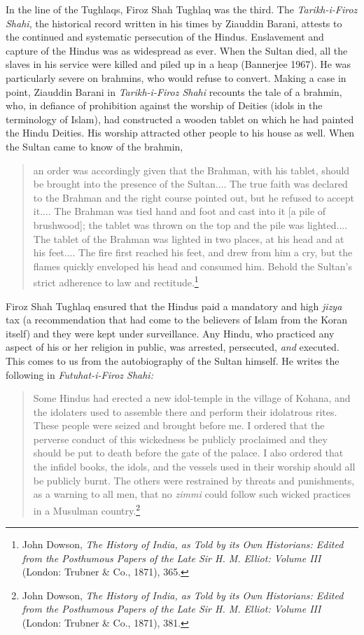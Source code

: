 In the line of the Tughlaqs, Firoz Shah Tughlaq was the third. The \textit{Tarikh-i-Firoz Shahi}, the historical record written in his times by Ziauddin Barani, attests to the continued and systematic persecution of the Hindus. Enslavement and capture of the Hindus was as widespread as ever. When the Sultan died, all the slaves in his service were killed and piled up in a heap (Bannerjee 1967). He was particularly severe on brahmins, who would refuse to convert. Making a case in point, Ziauddin Barani in \textit{Tarikh-i-Firoz Shahi} recounts the tale of a brahmin, who, in defiance of prohibition against the worship of Deities (idols in the terminology of Islam), had constructed a wooden tablet on which he had painted the Hindu Deities. His worship attracted other people to his house as well. When the Sultan came to know of the brahmin,
\begin{quote}
an order was accordingly given that the Brahman, with his tablet, should be brought into the presence of the Sultan.... The true faith was declared to the Brahman and the right course pointed out, but he refused to accept it.... The Brahman was tied hand and foot and cast into it [a pile of brushwood]; the tablet was thrown on the top and the pile was lighted.... The tablet of the Brahman was lighted in two places, at his head and at his feet.... The fire first reached his feet, and drew from him a cry, but the flames quickly enveloped his head and consumed him. Behold the Sultan's strict adherence to law and rectitude.\footnote{John Dowson, \textit{The History of India, as Told by its Own Historians: Edited from the Posthumous Papers of the Late Sir H. M. Elliot: Volume III} (London: Trubner \& Co., 1871), 365.}
\end{quote}
Firoz Shah Tughlaq ensured that the Hindus paid a mandatory and high \textit{jizya} tax (a recommendation that had come to the believers of Islam from the Koran itself) and they were kept under surveillance. Any Hindu, who practiced any aspect of his or her religion in public, was arrested, persecuted, \textit{and} executed. This comes to us from the autobiography of the Sultan himself. He writes the following in \textit{Futuhat-i-Firoz Shahi:} 
\begin{quote}
Some Hindus had erected a new idol-temple in the village of Kohana, and the idolaters used to assemble there and perform their idolatrous rites. These people were seized and brought before me. I ordered that the perverse conduct of this wickedness be publicly proclaimed and they should be put to death before the gate of the palace. I also ordered that the infidel books, the idols, and the vessels used in their worship should all be publicly burnt. The others were restrained by threats and punishments, as a warning to all men, that no \textit{zimmi} could follow such wicked practices in a Musulman country.\footnote{John Dowson, \textit{The History of India, as Told by its Own Historians: Edited from the Posthumous Papers of the Late Sir H. M. Elliot: Volume III} (London: Trubner \& Co., 1871), 381.}
\end{quote}
